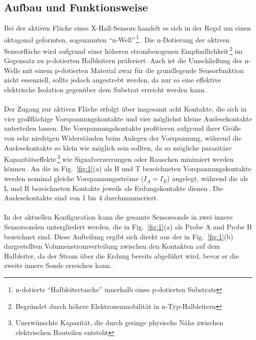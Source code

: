 \documentclass[12pt, a4paper]{article}
\begin{document}
\subsection{Aufbau und Funktionsweise}
Bei der aktiven Fläche eines X-Hall-Sensors handelt es sich in der Regel um einen oktagonal geformten, sogenannten ``n-Well''\,\footnote{n-dotierte ``Halbleitertasche'' innerhalb eines p-dotierten Substrats}\,\cite{cres18}. \newline
Die n-Dotierung der aktiven Sensorfläche wird aufgrund einer höheren strombezogenen Empfindlichkeit\,\footnote{Begründet durch höhere Elektronenmobilität in n-Typ-Halbleitern} im Gegensatz zu p-dotierten Halbleitern präferiert. %
Auch ist die Umschließung des n-Wells mit einem p-dotierten Material zwar für die grundlegende Sensorfunktion nicht essenziell, %
sollte jedoch  angestrebt werden, da nur so eine effektive elektrische Isolation gegenüber dem Substrat erreicht werden kann\,\cite{cres20}.\paragraph{}
Der Zugang zur aktiven Fläche erfolgt über insgesamt acht Kontakte, die sich in vier großflächige Vorspannungskontakte und vier möglichst kleine Auslesekontakte unterteilen lassen. Die Vorspannungskontakte profitieren aufgrund ihrer Größe von sehr niedrigen Widerständen beim Anlegen der Vorspannung, während die Auslesekontakte so klein wie möglich sein sollten, da so mögliche parasitäre Kapazitätseffekte\,\footnote{Unerwünschte Kapazität, die durch geringe physische Nähe zwischen elektrischen Bauteilen entsteht} %
wie Signalverzerrungen oder Rauschen minimiert werden können\,\cite{cres19}.\newline
An die in Fig.~\ref{fig:1}(a) als B und T bezeichneten Vorspannungskontakte werden nominal gleiche Vorspannungsströme ($I_A=I_B$) angelegt, während die als L und R bezeichneten Kontakte jeweils als Erdungskontakte dienen\,\cite{cres19}. Die Auslesekontakte sind von 1 bis 4 durchnummeriert.\paragraph{}
In der aktuellen Konfiguration kann die gesamte Sensorsonde in zwei innere Sensorsonden untergliedert werden, die in Fig.~\ref{fig:1}(a) als Probe A und Probe B bezeichnet sind. Diese Aufteilung ergibt sich direkt aus der in Fig.~\ref{fig:1}(b) dargestellten Volumenstromverteilung zwischen den Kontakten auf dem Halbleiter, da der Strom über die Erdung bereits abgeführt wird, bevor er die zweite innere Sonde erreichen kann\,\cite{cres20}.
\end{document}
